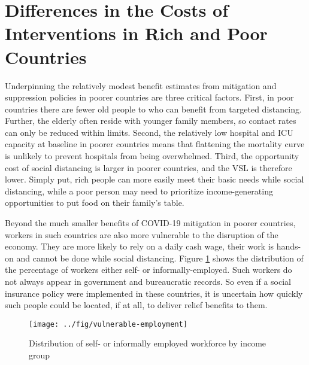 \documentclass[11pt]{article}
\begin{document}
\section{Differences in the Costs of Interventions in Rich and Poor Countries}


Underpinning the relatively modest benefit estimates from mitigation and suppression policies in poorer countries are three critical factors. First, in poor countries there are fewer old people to who can benefit from targeted distancing. Further, the elderly often reside with younger family members, so contact rates can only be reduced within limits. Second, the relatively low hospital and ICU capacity at baseline in poorer countries means that flattening the mortality curve is unlikely to prevent hospitals from being overwhelmed. Third, the opportunity cost of social distancing is larger in poorer countries, and the VSL is therefore lower. Simply put, rich people can more easily meet their basic needs while social distancing, while a poor person may need to prioritize income-generating opportunities to put food on their family's table.

Beyond the much smaller benefits of COVID-19 mitigation in poorer countries, workers in such countries are also more vulnerable to the disruption of the economy. They are more likely to rely on a daily cash wage, their work is hands-on and cannot be done while social distancing. Figure \ref{fig:employment} shows the distribution of the percentage of workers either self- or informally-employed. Such workers do not always appear in government and bureaucratic records. So even if a social insurance policy were implemented in these countries, it is uncertain how quickly such people could be located, if at all, to deliver relief benefits to them.

\begin{figure}
\centering
\caption{Distribution of self- or informally employed workforce by income group}
\texttt{[image: ../fig/vulnerable-employment]}
\label{fig:employment}
\end{figure}
\end{document}
